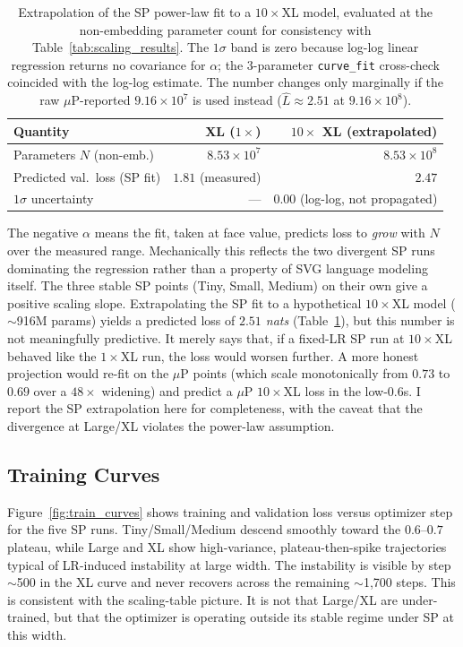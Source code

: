 \documentclass[a4paper]{article}
\begin{document}
\begin{table}[H]
\centering
\small
\begin{tabular}{lrr}
\toprule
Quantity & XL ($1\times$) & $10\times$ XL (extrapolated) \\
\midrule
Parameters $N$ (non-emb.)     & $8.53{\times}10^{7}$ & $8.53{\times}10^{8}$ \\
Predicted val.\ loss (SP fit) & $1.81$ (measured)    & $2.47$ \\
$1\sigma$ uncertainty         & ---                  & $0.00$ (log-log, not propagated) \\
\bottomrule
\end{tabular}
\caption{Extrapolation of the SP power-law fit to a $10\times$XL model, evaluated at the non-embedding parameter count for consistency with Table~\ref{tab:scaling_results}. The $1\sigma$ band is zero because log-log linear regression returns no covariance for $\alpha$; the 3-parameter \texttt{curve\_fit} cross-check coincided with the log-log estimate. The number changes only marginally if the raw $\mu$P-reported $9.16{\times}10^{7}$ is used instead ($\hat L \approx 2.51$ at $9.16{\times}10^{8}$).}
\label{tab:extrap}
\end{table}

The negative $\alpha$ means the fit, taken at face value, predicts loss to \emph{grow} with $N$ over the measured range. Mechanically this reflects the two divergent SP runs dominating the regression rather than a property of SVG language modeling itself. The three stable SP points (Tiny, Small, Medium) on their own give a positive scaling slope. Extrapolating the SP fit to a hypothetical $10\times$XL model ($\sim$916M params) yields a predicted loss of \emph{$2.51$ nats} (Table~\ref{tab:extrap}), but this number is not meaningfully predictive. It merely says that, if a fixed-LR SP run at $10\times$XL behaved like the $1\times$XL run, the loss would worsen further. A more honest projection would re-fit on the $\mu$P points (which scale monotonically from $0.73$ to $0.69$ over a $48\times$ widening) and predict a $\mu$P $10\times$XL loss in the low-$0.6$s. I report the SP extrapolation here for completeness, with the caveat that the divergence at Large/XL violates the power-law assumption. 

\subsection{Training Curves}

Figure~\ref{fig:train_curves} shows training and validation loss versus optimizer step for the five SP runs. Tiny/Small/Medium descend smoothly toward the $0.6$--$0.7$ plateau, while Large and XL show high-variance, plateau-then-spike trajectories typical of LR-induced instability at large width. The instability is visible by step $\sim$500 in the XL curve and never recovers across the remaining $\sim$1{,}700 steps. This is consistent with the scaling-table picture. It is not that Large/XL are under-trained, but that the optimizer is operating outside its stable regime under SP at this width.
\end{document}
